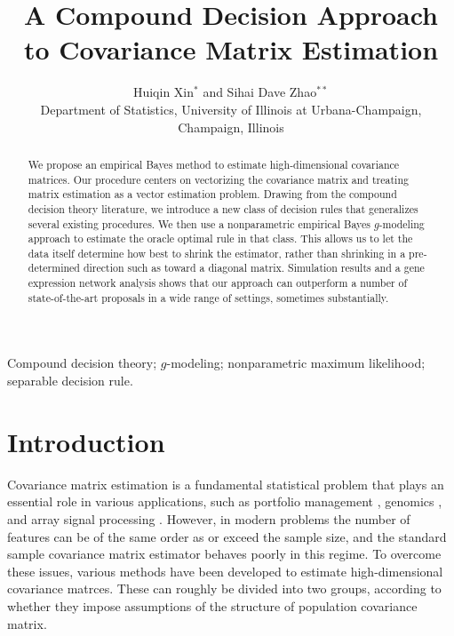 \documentclass[useAMS,referee,usenatbib]{biom}
\title[Empirical Bayes Covariance Matrix Estimation]{A Compound Decision Approach to Covariance Matrix Estimation}
\author{Huiqin Xin$^{*}$\email{huiqinx2@illinois.edu } and
Sihai Dave Zhao$^{**}$\email{sdzhao@illinois.edu} \\
Department of Statistics, University of Illinois at Urbana-Champaign, Champaign, Illinois}
\begin{document}

\label{firstpage}
\begin{abstract}
  We propose an empirical Bayes method to estimate high-dimensional covariance matrices. Our procedure centers on vectorizing the covariance matrix and treating matrix estimation as a vector estimation problem. Drawing from the compound decision theory literature, we introduce a new class of decision rules that generalizes several existing procedures. We then use a nonparametric empirical Bayes $g$-modeling approach to estimate the oracle optimal rule in that class. This allows us to let the data itself determine how best to shrink the estimator, rather than shrinking in a pre-determined direction such as toward a diagonal matrix. Simulation results and a gene expression network analysis shows that our approach can outperform a number of state-of-the-art proposals in a wide range of settings, sometimes substantially.
\end{abstract}

\begin{keywords}
Compound decision theory; $g$-modeling; nonparametric maximum likelihood; separable decision rule.
\end{keywords}

\maketitle

\section{Introduction}
\label{introduction}

Covariance matrix estimation is a fundamental statistical problem that plays an essential role in various applications, such as portfolio management \citep{ledoit2003improved}, genomics \citep{schafer2005shrinkage}, and array signal processing \citep{abramovich2001locally}. However, in modern problems the number of features can be of the same order as or exceed the sample size, and the standard sample covariance matrix estimator behaves poorly in this regime. To overcome these issues, various methods have been developed to estimate high-dimensional covariance matrces. These can roughly be divided into two groups, according to whether they impose assumptions of the structure of population covariance matrix.
\end{document}
